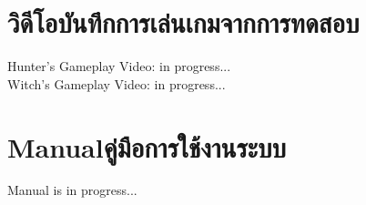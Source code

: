 \chapter{วิดีโอบันทึกการเล่นเกมจากการทดสอบ}

Hunter's Gameplay Video: in progress... \\
Witch's Gameplay Video: in progress...

\chapter{\ifenglish Manual\else คู่มือการใช้งานระบบ\fi}

Manual is in progress...
